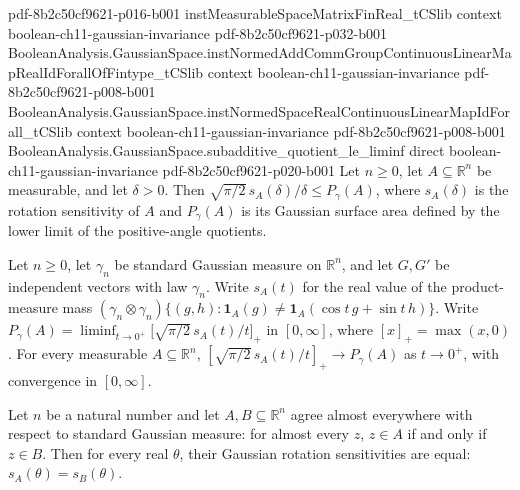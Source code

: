 \begin{lemma}
  {pdf-8b2c50cf9621-p016-b001}
\proofstep
  {instMeasurableSpaceMatrixFinReal_tCSlib}
  {context}
  {boolean-ch11-gaussian-invariance}
  {pdf-8b2c50cf9621-p032-b001}
\proofstep
  {BooleanAnalysis.GaussianSpace.instNormedAddCommGroupContinuousLinearMapRealIdForallOfFintype_tCSlib}
  {context}
  {boolean-ch11-gaussian-invariance}
  {pdf-8b2c50cf9621-p008-b001}
\proofstep
  {BooleanAnalysis.GaussianSpace.instNormedSpaceRealContinuousLinearMapIdForall_tCSlib}
  {context}
  {boolean-ch11-gaussian-invariance}
  {pdf-8b2c50cf9621-p008-b001}
\proofstep
  {BooleanAnalysis.GaussianSpace.subadditive_quotient_le_liminf}
  {direct}
  {boolean-ch11-gaussian-invariance}
  {pdf-8b2c50cf9621-p020-b001}
Let $n\ge 0$, let $A\subseteq\mathbb R^n$ be measurable, and let $\delta>0$. Then
$\sqrt{\pi/2}\,s_A(\delta)/\delta\le P_\gamma(A)$, where $s_A(\delta)$ is the rotation
sensitivity of $A$ and $P_\gamma(A)$ is its Gaussian surface area defined by the lower
limit of the positive-angle quotients.
\end{lemma}

\begin{theorem}
\leanok
{}
Let $n\ge0$, let $\gamma_n$ be standard Gaussian measure on $\mathbb R^n$, and let $G,G\prime$ be independent vectors with law $\gamma_n$. Write $s_A(t)$ for the real value of the product-measure mass $(\gamma_n\otimes\gamma_n)\{(g,h):\mathbf1_A(g)\ne\mathbf1_A(\cos t\,g+\sin t\,h)\}$. Write $P_\gamma(A)=\liminf_{t\to0^+}\bigl[\sqrt{\pi/2}\,s_A(t)/t\bigr]_+$ in $[0,\infty]$, where $[x]_+=\max(x,0)$. For every measurable $A\subseteq\mathbb R^n$, $[\sqrt{\pi/2}\,s_A(t)/t]_+\to P_\gamma(A)$ as $t\to0^+$, with convergence in $[0,\infty]$.
\end{theorem}

\begin{lemma}
\leanok
{}
Let $n$ be a natural number and let $A,B\subseteq\mathbb R^n$ agree almost everywhere
with respect to standard Gaussian measure: for almost every $z$, $z\in A$ if and only if
$z\in B$. Then for every real $\theta$, their Gaussian rotation sensitivities are equal:
$s_A(\theta)=s_B(\theta)$.
\end{lemma}

